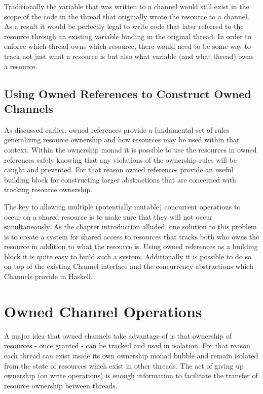 \documentclass[onehalf,11pt]{beavtex}
\begin{document}
Traditionally the variable that was written to a channel would still exist in the
scope of the code in the thread that originally wrote the resource to a channel.
As a result it would be perfectly legal to write code that later referred to the
resource through an existing variable binding in the original thread.
In order to enforce which thread owns which resource, there would need to be
some way to track not just what a resource is but also what variable (and what
thread) owns a resource.

\subsection{Using Owned References to Construct Owned Channels}

As discussed earlier, owned references provide a fundamental set of
rules generalizing resource ownership and how resources may be used within that
context.  Within the ownership monad it is possible to use the
resources in owned references safely knowing that any violations of
the ownership rules will be caught and prevented.  For that reason
owned references provide an useful building block for constructing
larger abstractions that are concerned with tracking resource ownership.

The key to allowing multiple (potentially mutable) concurrent operations to occur
on a shared resource is to make sure that they will not occur simultaneously.
As the chapter introduction alluded, one solution to this problem is to
create a system for shared access to resources that tracks both who owns the
resource in addition to what the resource is.
Using owned references as a building block it is quite easy to build
such a system. Additionally it is possible to do so on top of the existing
Channel interface and the concurrency abstractions which Channels provide in
Haskell.


\section{Owned Channel Operations}

A major idea that owned channels take advantage of is that ownership
of resources - once granted - can be tracked and used in isolation. For that reason
each thread can exist inside its own ownership monad bubble and
remain isolated from the state of resources which exist in other threads.
The act of giving up ownership  (on write operations) is enough information to
facilitate the transfer of resource ownership between threads.
\end{document}
